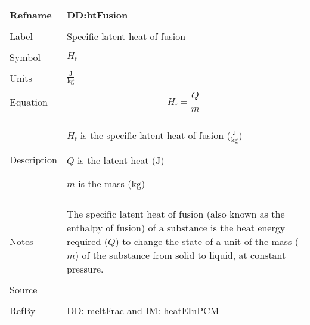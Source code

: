 \documentclass[12pt]{article}
\begin{document}
\vspace{\baselineskip}
\noindent
\begin{minipage}{\textwidth}
\begin{tabular}{>{\raggedright}p{}>{\raggedright\arraybackslash}p{}}
\toprule \textbf{Refname} & \textbf{DD:htFusion}
\label{DD:htFusion}
\\ \midrule \\
Label & Specific latent heat of fusion
        
\\ \midrule \\
Symbol & ${H_{\text{f}}}$
         
\\ \midrule \\
Units & $\frac{\text{J}}{\text{kg}}$
        
\\ \midrule \\
Equation & \begin{displaymath}
           {H_{\text{f}}}=\frac{Q}{m}
           \end{displaymath}
\\ \midrule \\
Description & \begin{symbDescription}
              \item{${H_{\text{f}}}$ is the specific latent heat of fusion ($\frac{\text{J}}{\text{kg}}$)}
              \item{$Q$ is the latent heat (${\text{J}}$)}
              \item{$m$ is the mass (${\text{kg}}$)}
              \end{symbDescription}
\\ \midrule \\
Notes & The specific latent heat of fusion (also known as the enthalpy of fusion) of a substance is the heat energy required ($Q$) to change the state of a unit of the mass ($m$) of the substance from solid to liquid, at constant pressure.
        
\\ \midrule \\
Source & \cite[(pg. 282)]{bueche1986}
         
\\ \midrule \\
RefBy & \hyperref[DD:meltFrac]{DD: meltFrac} and \hyperref[IM:heatEInPCM]{IM: heatEInPCM}
        
\\ \bottomrule
\end{tabular}
\end{minipage}
\end{document}
